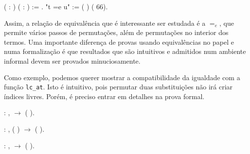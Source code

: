   ( : ) ( : ) :=    .\coqdoceol
{} "t =e u" := (  ) (  66).\coqdoceol
\bigskip

Assim, a relação de equivalência que é interessante ser estudada é a $=_e$, que
permite vários passos de permutações, além de permutações no interior dos
termos. Uma importante diferença de provas usando equivalências no papel e numa
formalização é que resultados que são intuitivos e admitidos num ambiente
informal devem ser provados minuciosamente.

Como exemplo, podemos querer mostrar a compatibilidade da igualdade com a
função \texttt{lc\_at}. Isto é intuitivo, pois permutar duas substituições não
irá criar índices livres. Porém, é preciso entrar em detalhes na prova formal. 

\bigskip
\coqnoindent {}  : \coqdockw{\ensuremath{\forall}}   ,     \ensuremath{\rightarrow} (      ).\coqdoceol

\coqnoindent {}  : \coqdockw{\ensuremath{\forall}}   , ( )    \ensuremath{\rightarrow} (      ).\coqdoceol

\coqnoindent {}  : \coqdockw{\ensuremath{\forall}}   ,    \ensuremath{\rightarrow} (      ).\coqdoceol

